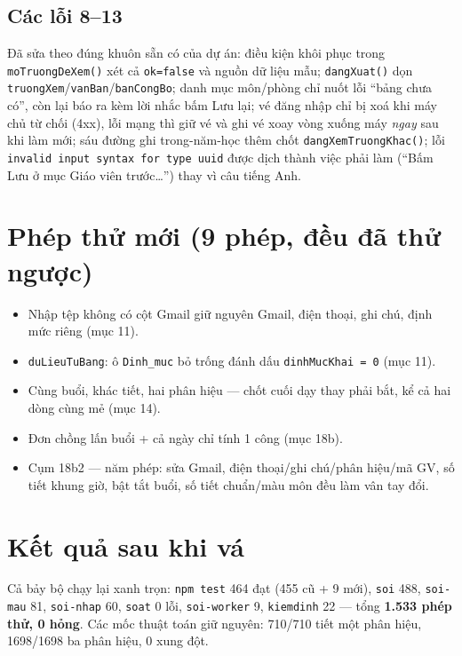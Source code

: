 \documentclass[12pt,a4paper]{article}
\begin{document}
\subsection*{Các lỗi 8--13}
Đã sửa theo đúng khuôn sẵn có của dự án: điều kiện khôi phục trong
\texttt{moTruongDeXem()} xét cả \texttt{ok=false} và nguồn dữ liệu mẫu;
\texttt{dangXuat()} dọn \texttt{truongXem}/\texttt{vanBan}/\texttt{banCongBo};
danh mục môn/phòng chỉ nuốt lỗi ``bảng chưa có'', còn lại báo ra kèm lời nhắc
bấm Lưu lại; vé đăng nhập chỉ bị xoá khi máy chủ từ chối (4xx), lỗi mạng thì giữ
vé và ghi vé xoay vòng xuống máy \emph{ngay} sau khi làm mới; sáu đường ghi
trong-năm-học thêm chốt \texttt{dangXemTruongKhac()}; lỗi
\texttt{invalid input syntax for type uuid} được dịch thành việc phải làm
(``Bấm Lưu ở mục Giáo viên trước\dots'') thay vì câu tiếng Anh.

\section{Phép thử mới (9 phép, đều đã thử ngược)}
\begin{itemize}[leftmargin=1.4em,itemsep=1pt]
  \item Nhập tệp không có cột Gmail giữ nguyên Gmail, điện thoại, ghi chú, định mức riêng (mục 11).
  \item \texttt{duLieuTuBang}: ô \texttt{Dinh\_muc} bỏ trống đánh dấu \texttt{dinhMucKhai = 0} (mục 11).
  \item Cùng buổi, khác tiết, hai phân hiệu --- chốt cuối dạy thay phải bắt, kể cả hai dòng cùng mẻ (mục 14).
  \item Đơn chồng lấn buổi + cả ngày chỉ tính 1 công (mục 18b).
  \item Cụm 18b2 --- năm phép: sửa Gmail, điện thoại/ghi chú/phân hiệu/mã GV, số tiết khung giờ,
        bật tắt buổi, số tiết chuẩn/màu môn đều làm vân tay đổi.
\end{itemize}

\section{Kết quả sau khi vá}
Cả bảy bộ chạy lại xanh trọn: \texttt{npm test} 464 đạt (455 cũ + 9 mới),
\texttt{soi} 488, \texttt{soi-mau} 81, \texttt{soi-nhap} 60, \texttt{soat} 0
lỗi, \texttt{soi-worker} 9, \texttt{kiemdinh} 22 --- tổng \textbf{1.533 phép
thử, 0 hỏng}. Các mốc thuật toán giữ nguyên: 710/710 tiết một phân hiệu,
1698/1698 ba phân hiệu, 0 xung đột.
\end{document}

